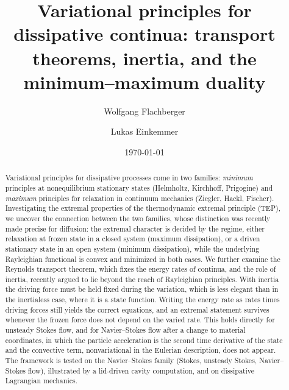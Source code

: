 \documentclass[aip,pof,reprint,amsmath,amssymb,longbibliography]{revtex4-2}
\begin{document}
\title{Variational principles for dissipative continua: transport theorems, inertia, and the minimum--maximum duality}

\author{Wolfgang Flachberger}
\author{Lukas Einkemmer}

\date{\today}

\begin{abstract}
Variational principles for dissipative processes come in two families: \textit{minimum} principles at nonequilibrium stationary states (Helmholtz, Kirchhoff, Prigogine) and \textit{maximum} principles for relaxation in continuum mechanics (Ziegler, Hackl, Fischer). Investigating the extremal properties of the thermodynamic extremal principle (TEP), we uncover the connection between the two families, whose distinction was recently made precise for diffusion: the extremal character is decided by the regime, either relaxation at frozen state in a closed system (maximum dissipation), or a driven stationary state in an open system (minimum dissipation), while the underlying Rayleighian functional is convex and minimized in both cases. We further examine the Reynolds transport theorem, which fixes the energy rates of continua, and the role of inertia, recently argued to lie beyond the reach of Rayleighian principles. With inertia the driving force must be held fixed during the variation, which is less elegant than in the inertialess case, where it is a state function. Writing the energy rate as rates times driving forces still yields the correct equations, and an extremal statement survives whenever the frozen force does not depend on the varied rate. This holds directly for unsteady Stokes flow, and for Navier--Stokes flow after a change to material coordinates, in which the particle acceleration is the second time derivative of the state and the convective term, nonvariational in the Eulerian description, does not appear. The framework is tested on the Navier--Stokes family (Stokes, unsteady Stokes, Navier--Stokes flow), illustrated by a lid-driven cavity computation, and on dissipative Lagrangian mechanics.
\end{abstract}

\maketitle
\end{document}
